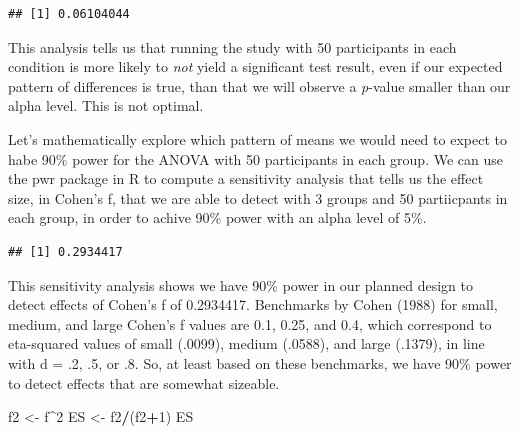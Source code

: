 \documentclass[]{article}
\newenvironment{Shaded}{\begin{snugshade}}{\end{snugshade}}
\newcommand{\KeywordTok}[1]{\textcolor[rgb]{0.13,0.29,0.53}{\textbf{#1}}}
\newcommand{\DataTypeTok}[1]{\textcolor[rgb]{0.13,0.29,0.53}{#1}}
\newcommand{\DecValTok}[1]{\textcolor[rgb]{0.00,0.00,0.81}{#1}}
\newcommand{\FloatTok}[1]{\textcolor[rgb]{0.00,0.00,0.81}{#1}}
\newcommand{\StringTok}[1]{\textcolor[rgb]{0.31,0.60,0.02}{#1}}
\newcommand{\CommentTok}[1]{\textcolor[rgb]{0.56,0.35,0.01}{\textit{#1}}}
\newcommand{\OperatorTok}[1]{\textcolor[rgb]{0.81,0.36,0.00}{\textbf{#1}}}
\newcommand{\NormalTok}[1]{#1}
\begin{document}
\begin{verbatim}
## [1] 0.06104044
\end{verbatim}

This analysis tells us that running the study with 50 participants in
each condition is more likely to \emph{not} yield a significant test
result, even if our expected pattern of differences is true, than that
we will observe a \emph{p}-value smaller than our alpha level. This is
not optimal.

Let's mathematically explore which pattern of means we would need to
expect to habe 90\% power for the ANOVA with 50 participants in each
group. We can use the pwr package in R to compute a sensitivity analysis
that tells us the effect size, in Cohen's f, that we are able to detect
with 3 groups and 50 partiicpants in each group, in order to achive 90\%
power with an alpha level of 5\%.

\begin{Shaded}
\end{Shaded}

\begin{verbatim}
## [1] 0.2934417
\end{verbatim}

This sensitivity analysis shows we have 90\% power in our planned design
to detect effects of Cohen's f of 0.2934417. Benchmarks by Cohen (1988)
for small, medium, and large Cohen's f values are 0.1, 0.25, and 0.4,
which correspond to eta-squared values of small (.0099), medium (.0588),
and large (.1379), in line with d = .2, .5, or .8. So, at least based on
these benchmarks, we have 90\% power to detect effects that are somewhat
sizeable.

\begin{Shaded}
\begin{Highlighting}[]
\NormalTok{f2 <-}\StringTok{ }\NormalTok{f}\OperatorTok{^}\DecValTok{2}
\NormalTok{ES <-}\StringTok{ }\NormalTok{f2}\OperatorTok{/}\NormalTok{(f2}\OperatorTok{+}\DecValTok{1}\NormalTok{)}
\NormalTok{ES}
\end{Highlighting}
\end{Shaded}
\end{document}
